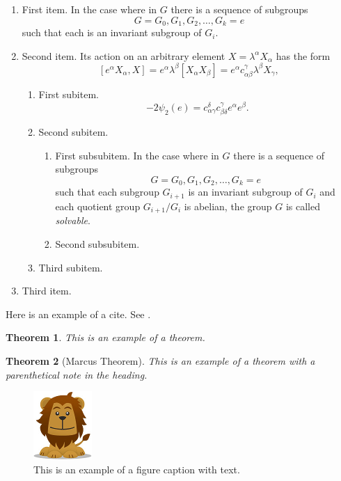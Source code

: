 \documentclass{amsart}
\newtheorem{theorem}{Theorem}[section]
\theoremstyle{definition}
\theoremstyle{remark}
\numberwithin{equation}{section}
\newcommand{\blankbox}[2]{%
  \parbox{\columnwidth}{\centering
    \setlength{\fboxsep}{0pt}%
    \fbox{\raisebox{0pt}[#2]{\hspace{#1}}}%
  }%
}
\begin{document}
\begin{enumerate}
\item First item.
In the case where in $G$ there is a sequence of subgroups
\[
G = G_0, G_1, G_2, \dots, G_k = e
\]
such that each is an invariant subgroup of $G_i$.

\item Second item.
Its action on an arbitrary element $X = \lambda^\alpha X_\alpha$ has the
form
\begin{equation}\label{eq:action}
[e^\alpha X_\alpha, X] = e^\alpha \lambda^\beta
[X_\alpha X_\beta] = e^\alpha c^\gamma_{\alpha \beta}
 \lambda^\beta X_\gamma,
\end{equation}

\begin{enumerate}
\item First subitem.
\[
- 2\psi_2(e) =  c_{\alpha \gamma}^\delta c_{\beta \delta}^\gamma
e^\alpha e^\beta.
\]

\item Second subitem.
\begin{enumerate}
\item First subsubitem.
In the case where in $G$ there is a sequence of subgroups
\[
G = G_0, G_1, G_2, \ldots, G_k = e
\]
such that each subgroup $G_{i+1}$ is an invariant subgroup of $G_i$ and
each quotient group $G_{i+1}/G_{i}$ is abelian, the group $G$ is called
\textit{solvable}.

\item Second subsubitem.
\end{enumerate}
\item Third subitem.
\end{enumerate}
\item Third item.
\end{enumerate}

Here is an example of a cite. See \cite{A}.

\begin{theorem}
This is an example of a theorem.
\end{theorem}

\begin{theorem}[Marcus Theorem]
This is an example of a theorem with a parenthetical note in the
heading.
\end{theorem}

\begin{figure}[tb]
\includegraphics{lion.png}
\caption{This is an example of a figure caption with text.}
\label{firstfig}
\end{figure}
\end{document}
